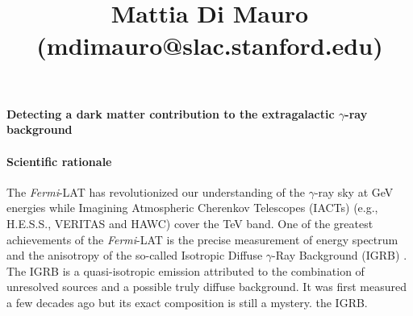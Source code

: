 \documentclass[12 pt]{article}
\title{\vspace{-2.0cm}{\Large Probing dark matter and cosmic evolution of extragalactic sources with the {\it Fermi} isotropic diffuse $\gamma$-ray background}  \\
{\large \bf{Mattia Di Mauro} (mdimauro@slac.stanford.edu)}}
\date{}
\newcommand{\FIXME}[1]{{\color{red}{\em Comment: }{#1}}}
\begin{document}

\vspace{-1.0cm}
\paragraph{Detecting a dark matter contribution to the extragalactic $\gamma$-ray background}

\vspace{-2.0cm}
\paragraph{Scientific rationale}

The {\it Fermi}-LAT has revolutionized our understanding of the $\gamma$-ray sky at GeV energies while Imagining Atmospheric Cherenkov Telescopes (IACTs) (e.g., H.E.S.S., VERITAS and HAWC) cover the TeV band.
One of the greatest achievements of the {\it Fermi}-LAT is the precise measurement of energy spectrum and the anisotropy of the so-called Isotropic Diffuse $\gamma$-Ray Background (IGRB) \cite{Ackermann:2014usa,2012PhRvD..85h3007A}. 
The IGRB is a quasi-isotropic emission attributed to the combination of unresolved sources and a possible
truly diffuse background. It was first measured a few decades ago but its exact composition is still a mystery.
the IGRB. 
\end{document}
